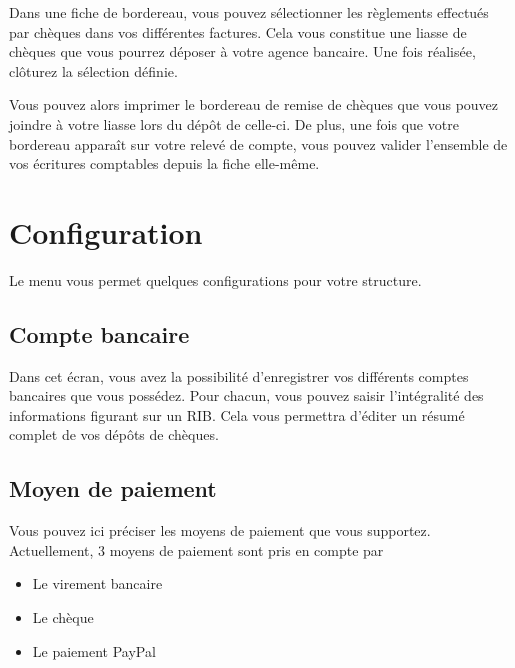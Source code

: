 \documentclass[a4paper,10pt,oneside,french]{sphinxmanual}
\begin{document}
Dans une fiche de bordereau, vous pouvez sélectionner les règlements effectués par chèques dans vos différentes factures.
Cela vous constitue une liasse de chèques que vous pourrez déposer à votre agence bancaire.
Une fois réalisée, clôturez la sélection définie.
\begin{quote}

\noindent{}
\end{quote}

Vous pouvez alors imprimer le bordereau de remise de chèques que vous pouvez joindre à votre liasse lors du dépôt de celle-ci.
De plus, une fois que votre bordereau apparaît sur votre relevé de compte, vous pouvez valider l’ensemble de vos écritures comptables depuis la fiche elle-même.


\section{Configuration}
\label{\detokenize{payoff/config::doc}}\label{\detokenize{payoff/config:configuration}}
Le menu  vous permet quelques configurations pour votre structure.


\subsection{Compte bancaire}
\label{\detokenize{payoff/config:compte-bancaire}}
Dans cet écran, vous avez la possibilité d’enregistrer vos différents comptes bancaires que vous possédez.
Pour chacun, vous pouvez saisir l’intégralité des informations figurant sur un RIB.
Cela vous permettra d’éditer un résumé complet de vos dépôts de chèques.


\subsection{Moyen de paiement}
\label{\detokenize{payoff/config:moyen-de-paiement}}
Vous pouvez ici préciser les moyens de paiement que vous supportez.
Actuellement, 3 moyens de paiement sont pris en compte par 
\begin{itemize}
\item {} 
Le virement bancaire

\item {} 
Le chèque

\item {} 
Le paiement PayPal

\end{itemize}
\end{document}
